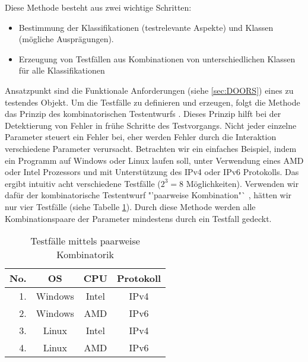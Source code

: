  Diese Methode besteht aus zwei wichtige Schritten:
\begin{itemize}
\item Bestimmung der Klassifikationen (testrelevante Aspekte) und Klassen (mögliche Ausprägungen).
\item Erzeugung von Testfällen aus Kombinationen von unterschiedlichen Klassen für alle Klassifikationen
\end{itemize}

Ansatzpunkt sind die Funktionale Anforderungen (siehe \ref{sec:DOORS}) eines zu testendes Objekt. Um die Testfälle zu definieren und erzeugen, folgt die Methode das Prinzip des kombinatorischen Testentwurfs \cite{KlassifikationsbaumMethode}. Dieses Prinzip hilft bei der Detektierung von Fehler in frühe Schritte des Testvorgangs. Nicht jeder einzelne Parameter steuert ein Fehler bei, eher werden Fehler durch die Interaktion verschiedene Parameter verursacht. Betrachten wir ein einfaches Beispiel, indem ein Programm auf Windows oder Linux laufen soll, unter Verwendung eines AMD oder Intel Prozessors und mit Unterstützung des IPv4 oder IPv6 Protokolls. Das ergibt intuitiv acht verschiedene Testfälle ($2^{3} = 8$ Möglichkeiten). Verwenden wir dafür der kombinatorische Testentwurf "'paarweise Kombination"` , hätten wir nur vier Testfälle (siehe Tabelle \ref{table:4TestCases}). Durch diese Methode werden alle Kombinationspaare der Parameter mindestens durch ein Testfall gedeckt\cite{CombinatorialSTesting}.\\

\begin{table}[h]


\begin{center}
	\begin{tabular}{|r||c|c|c|}
	 \hline
	 No. &OS &CPU &Protokoll\\
	 \hline
	 1. &Windows &Intel &IPv4\\
	 \hline
	 2. &Windows &AMD &IPv6\\
	 \hline
	 3. &Linux &Intel &IPv4\\
	 \hline
	 4. &Linux &AMD &IPv6\\
	 \hline
	\end{tabular}
	
	\caption{Testfälle mittels paarweise Kombinatorik}
	\label{table:4TestCases}
\end{center}

\end{table}



